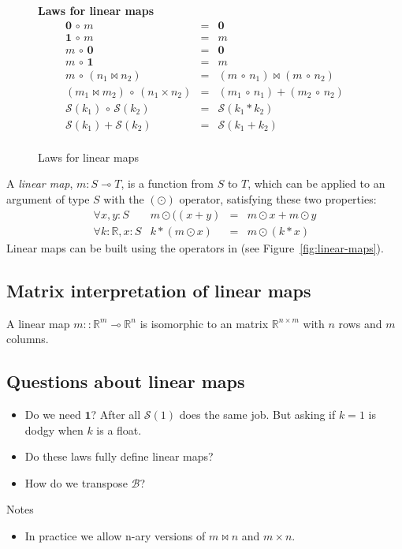 \documentclass[sigplan,review]{acmart}
\newcommand{\linto}{\multimap}     %
\newcommand{\typ}[2]{#1 \! : \! #2}  %
\newcommand{\real}{\mathbb{R}}       %
\newcommand{\lmapply}{\odot}   %
\newcommand{\lmcomp}{\,\circ\,}   %
\newcommand{\lmpair}{\times}         %
\newcommand{\lmjoin}{\bowtie}        %
\newcommand{\lmzero}{\mathbf{0}}     %
\newcommand{\lmone}{\mathbf{1}}      %
\newcommand{\lmscalar}[1]{{\mathcal S}(#1)}      %
\newcommand{\lmbuild}{\mathcal B}             %
\begin{document}
\begin{figure}
{\begin{minipage}{\columnwidth}
  {\bf Laws for linear maps}
  $$
  \begin{array}{rcl}
    \lmzero \lmcomp m & = & \lmzero \\
    \lmone \lmcomp m & = & m \\
    m \lmcomp \lmzero & = & \lmzero \\
    m \lmcomp \lmone & = & m \\
    m \lmcomp (n_1 \lmjoin n_2) & = & (m \lmcomp n_1) \lmjoin (m \lmcomp n_2) \\
    (m_1 \lmjoin m_2) \lmcomp (n_1 \lmpair n_2) & = & (m_1 \lmcomp n_1) + (m_2 \lmcomp n_2) \\
    \lmscalar{k_1} \lmcomp \lmscalar{k_2} & = & \lmscalar{ k_1 * k_2 } \\
    \lmscalar{k_1} + \lmscalar{k_2} & = & \lmscalar{ k_1 + k_2 } \\
  \end{array}
  $$
    \end{minipage}
    }
    \caption{Laws for linear maps} \label{fig:lm-laws}
\end{figure}

A \emph{linear map}, $m : S \linto T$, is a function from $S$ to $T$,
which can be applied to an argument of type $S$ with the $(\lmapply)$ operator,
satisfying these two properties:
$$
\begin{array}{rrcl}
  \forall \typ{x,y}{S} &  m \lmapply ((x+y) & = & m \lmapply x + m \lmapply y \\
  \forall \typ{k}{\real}, \typ{x}{S} & k * (m \lmapply x) & = & m \lmapply (k * x)
\end{array}
$$
Linear maps can be built using the operators in (see Figure~\ref{fig:linear-maps}).

\subsection{Matrix interpretation of linear maps}

A linear map $m :: \real^m \linto \real^n$ is isomorphic to an matrix $\real^{n \times m}$ with $n$ rows and $m$ columns.

\subsection{Questions about linear maps}

\begin{itemize}
\item Do we need $\lmone$? After all $\lmscalar{1}$ does the same job.  But asking if $k=1$ is dodgy when $k$ is a float.
\item Do these laws fully define linear maps?
\item How do we transpose $\lmbuild$?
\end{itemize}
Notes
\begin{itemize}
\item In practice we allow n-ary versions of $m \lmjoin n$ and $m \lmpair n$.
\end{itemize}
\end{document}

